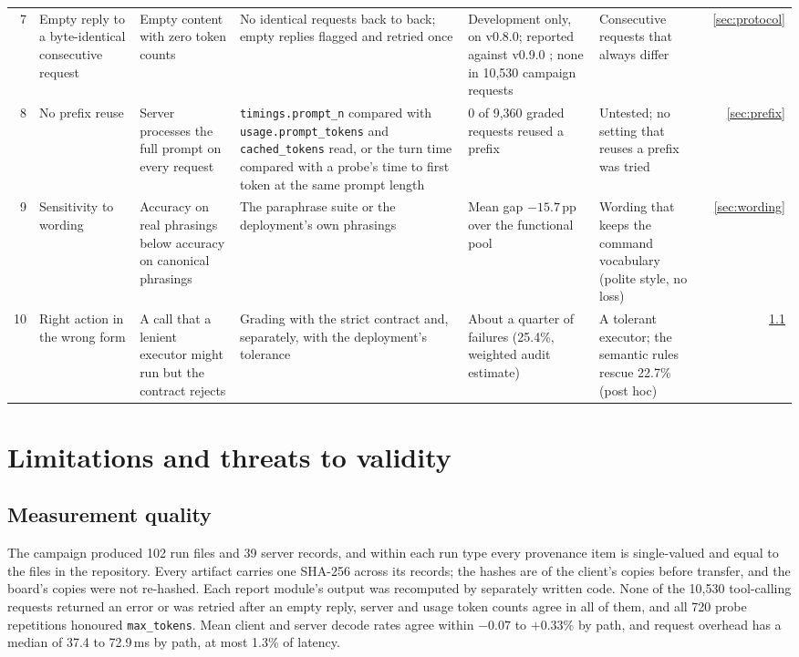 \documentclass[11pt]{article}
\begin{document}
\begin{table}[tbp]
\begin{tabularx}{\linewidth}{@{}rLLLLLr@{}}
7 & Empty reply to a byte-identical consecutive request & Empty content with zero token counts & No identical requests back to back; empty replies flagged and retried once & Development only, on v0.8.0; reported against v0.9.0 \citep{geniexIssue1554}; none in 10,530 campaign requests & Consecutive requests that always differ & \ref{sec:protocol} \\
8 & No prefix reuse & Server processes the full prompt on every request & \texttt{timings.prompt\_n} compared with \texttt{usage.prompt\_tokens} and \texttt{cached\_tokens} read, or the turn time compared with a probe's time to first token at the same prompt length & 0 of 9,360 graded requests reused a prefix & Untested; no setting that reuses a prefix was tried & \ref{sec:prefix} \\
9 & Sensitivity to wording & Accuracy on real phrasings below accuracy on canonical phrasings & The paraphrase suite or the deployment's own phrasings & Mean gap $-15.7$\,pp over the functional pool & Wording that keeps the command vocabulary (polite style, no loss) & \ref{sec:wording} \\
10 & Right action in the wrong form & A call that a lenient executor might run but the contract rejects & Grading with the strict contract and, separately, with the deployment's tolerance & About a quarter of failures (25.4\%, weighted audit estimate) & A tolerant executor; the semantic rules rescue 22.7\% (post hoc) & \ref{sec:quality} \\
\bottomrule
\end{tabularx}
\end{table}

\section{Limitations and threats to validity}\label{sec:limits}

\subsection{Measurement quality}\label{sec:quality}

The campaign produced 102 run files and 39 server records, and within each run type every provenance item is single-valued and equal to the files in the repository. Every artifact carries one SHA-256 across its records; the hashes are of the client's copies before transfer, and the board's copies were not re-hashed. Each report module's output was recomputed by separately written code. None of the 10,530 tool-calling requests returned an error or was retried after an empty reply, server and usage token counts agree in all of them, and all 720 probe repetitions honoured \texttt{max\_tokens}. Mean client and server decode rates agree within $-0.07$ to $+0.33$\% by path, and request overhead has a median of 37.4 to 72.9\,ms by path, at most 1.3\% of latency.
\end{document}
